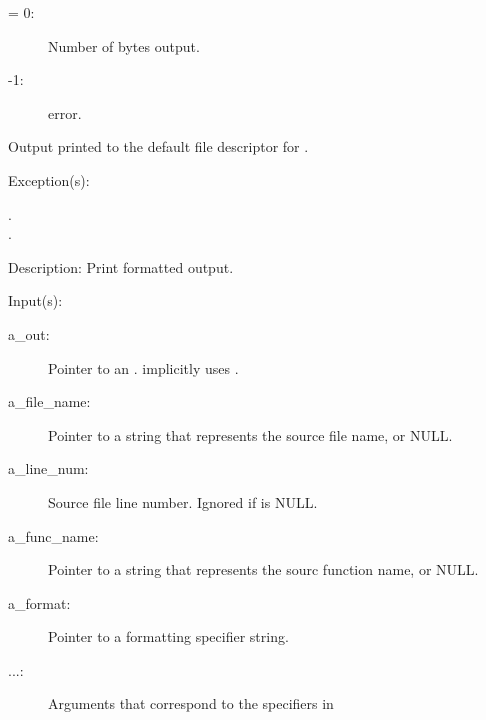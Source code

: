 \begin{capi}
\begin{capilist}
\begin{description}
		\item[retval: ]
			\begin{description}\item[]
			\item[{\gt}= 0: ]
				Number of bytes output.
			\item[-1: ]
				 error.
			\end{description}
		\item{Output printed to the default file descriptor for
			.}
		\end{description}
	\item[Exception(s): ]
		\begin{description}\item[]
		\item[.]
		\item[.]
		\end{description}
	\item[Description: ]
		Print formatted output.
	\end{capilist}
\label{out_put_e}
\label{_cw_out_put_e}
	\begin{capilist}
	\item[Input(s): ]
		\begin{description}\item[]
		\item[a\_out: ]
			Pointer to an .
			 implicitly uses
			.
		\item[a\_file\_name: ]
			Pointer to a string that represents the source file
			name, or NULL.
		\item[a\_line\_num: ]
			Source file line number.  Ignored if
			 is NULL.
		\item[a\_func\_name: ]
			Pointer to a string that represents the sourc function
			name, or NULL.
		\item[a\_format: ]
			Pointer to a formatting specifier string.
		\item[...: ]
			Arguments that correspond to the specifiers in

\end{description}
\end{capilist}
\end{capi}
